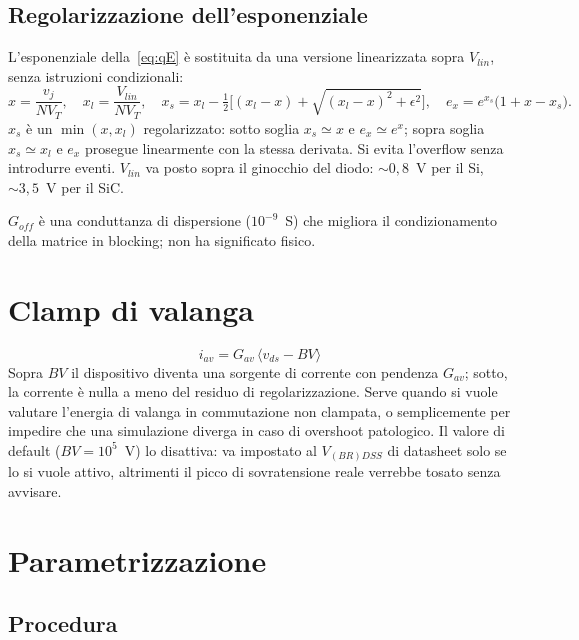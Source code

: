 \documentclass[11pt,a4paper]{article}
\begin{document}
\subsection{Regolarizzazione dell'esponenziale}

L'esponenziale della~\eqref{eq:qE} è sostituita da una versione linearizzata
sopra $V_{lin}$, senza istruzioni condizionali:
\begin{equation}
  x=\frac{v_j}{NV_T},\quad
  x_l=\frac{V_{lin}}{NV_T},\quad
  x_s=x_l-\tfrac12\Big[(x_l-x)+\sqrt{(x_l-x)^2+\epsilon^2}\Big],\quad
  e_x=e^{x_s}\big(1+x-x_s\big).
\end{equation}
$x_s$ è un $\min(x,x_l)$ regolarizzato: sotto soglia $x_s\simeq x$ e
$e_x\simeq e^x$; sopra soglia $x_s\simeq x_l$ e $e_x$ prosegue linearmente
con la stessa derivata. Si evita l'overflow senza introdurre eventi.
$V_{lin}$ va posto sopra il ginocchio del diodo: $\sim0{,}8$~V per il Si,
$\sim3{,}5$~V per il SiC.

$G_{off}$ è una conduttanza di dispersione ($10^{-9}$~S) che migliora il
condizionamento della matrice in blocking; non ha significato fisico.

\section{Clamp di valanga}

\begin{equation}
  i_{av}=G_{av}\,\big\langle v_{ds}-BV\big\rangle
\end{equation}
Sopra $BV$ il dispositivo diventa una sorgente di corrente con pendenza
$G_{av}$; sotto, la corrente è nulla a meno del residuo di
regolarizzazione. Serve quando si vuole valutare l'energia di valanga in
commutazione non clampata, o semplicemente per impedire che una simulazione
diverga in caso di overshoot patologico. Il valore di default
($BV=10^5$~V) lo disattiva: va impostato al $V_{(BR)DSS}$ di datasheet solo
se lo si vuole attivo, altrimenti il picco di sovratensione reale verrebbe
tosato senza avvisare.

\section{Parametrizzazione}\label{sec:param}

\subsection{Procedura}
\end{document}
